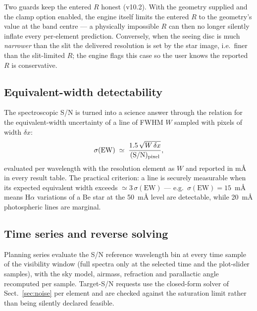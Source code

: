 Two guards keep the entered $R$ honest (v10.2). With the geometry
supplied and the clamp option enabled, the engine itself limits the
entered $R$ to the geometry's value at the band centre — a physically
impossible $R$ can then no longer silently inflate every per-element
prediction. Conversely, when the seeing disc is much \emph{narrower}
than the slit the delivered resolution is set by the star image, i.e.\
finer than the slit-limited $R$; the engine flags this case so the user
knows the reported $R$ is conservative.

\subsection{Equivalent-width detectability}
\label{sec:ew}

The spectroscopic S/N is turned into a science answer through the
\citet{cayrel1988} relation for the equivalent-width uncertainty of a line
of FWHM $W$ sampled with pixels of width $\delta x$:
\begin{equation}
  \sigma(\mathrm{EW}) \;\simeq\; \frac{1.5\,\sqrt{W\,\delta x}}
  {(\mathrm{S/N})_{\rm pixel}},
  \label{eq:cayrel}
\end{equation}
evaluated per wavelength with the resolution element as $W$ and reported
in m\AA{} in every result table. The practical criterion: a line is
securely measurable when its expected equivalent width exceeds
$\simeq 3\,\sigma(\mathrm{EW})$ — e.g.\ $\sigma(\mathrm{EW}) = 15$~m\AA{}
means H$\alpha$ variations of a Be star at the 50~m\AA{} level are
detectable, while 20~m\AA{} photospheric lines are marginal.

\subsection{Time series and reverse solving}

Planning series evaluate the S/N reference wavelength bin at every time
sample of the visibility window (full spectra only at the selected time and
the plot-slider samples), with the sky model, airmass, refraction and
parallactic angle recomputed per sample. Target-S/N requests use the
closed-form solver of Sect.~\ref{sec:noise} per element and are checked
against the saturation limit rather than being silently declared feasible.
